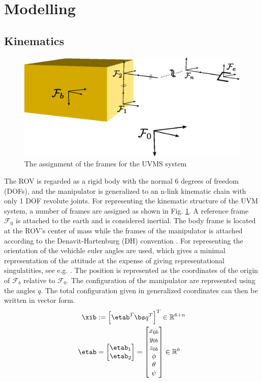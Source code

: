 
\section{Modelling}

\subsection{Kinematics}

\begin{figure}[h!]
  \centering
  \includegraphics[scale=0.6]{./figures/uvms_kinematics.eps}
  \caption{The assignment of the frames for the UVMS system}
  \label{fig:uvms_kinematics}
\end{figure}
The ROV is regarded as a rigid body with the normal 6 degrees of freedom (DOFs), and the manipulator is generalized to an n-link kinematic chain with only 1 DOF revolute joints. For representing the kinematic structure of the UVM system, a number of frames are assigned as shown in Fig. \ref{fig:uvms_kinematics}. A reference frame $\mathcal{F}_0$ is attached to the earth and is considered inertial. The body frame is located at the ROV's center of mass while the frames of the manipulator is attached according to the Denavit-Hartenburg (DH) convention \cite{spong2005robot}. 
For representing the orientation of the vehichle euler angles are used, which gives a minimal representation of the attitude at the expense of giving representational singulatities, see e.g. \cite{fs}. The position is represented as the coordinates of the origin of $\mathcal{F}_b$ relative to $\mathcal{F}_0$. The configuration of the manipulator are represented using the angles $q$. The total configuration given in generalized coordinates can then be written in vector form.
\begin{align*}
  \xib&:= \left[ \etab^T \bs q^T \right]^T \in \mathbb{R}^{6+n}
  \\
  \etab &= \begin{bmatrix}\etab_1 \\ \etab_2 \end{bmatrix}  = \begin{bmatrix} x_{0b} \\ y_{0b} \\ z_{0b} \\ \phi \\ \theta \\ \psi \end{bmatrix} \in \mathbb{R}^{6}
\end{align*}
